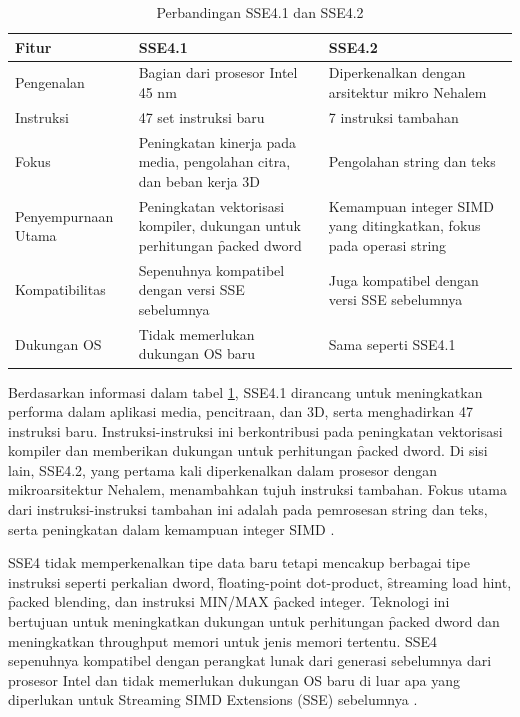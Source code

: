 \begin{table}[h]
	\centering
	\begin{tabular}{|p{3cm}|p{4.6cm}|p{4.6cm}|}
		\hline
		\textbf{Fitur}      & \textbf{SSE4.1}                                                               & \textbf{SSE4.2}                                                     \\ \hline
		Pengenalan          & Bagian dari prosesor Intel 45 nm                                              & Diperkenalkan dengan arsitektur mikro Nehalem                       \\ \hline
		Instruksi           & 47 set instruksi baru                                                         & 7 instruksi tambahan                                                \\ \hline
		Fokus               & Peningkatan kinerja pada media, pengolahan citra, dan beban kerja 3D          & Pengolahan string dan teks                                          \\ \hline
		Penyempurnaan Utama & Peningkatan vektorisasi kompiler, dukungan untuk perhitungan \f{packed dword} & Kemampuan integer SIMD yang ditingkatkan, fokus pada operasi string \\ \hline
		Kompatibilitas      & Sepenuhnya kompatibel dengan versi SSE sebelumnya                             & Juga kompatibel dengan versi SSE sebelumnya                         \\ \hline
		Dukungan OS         & Tidak memerlukan dukungan OS baru                                             & Sama seperti SSE4.1                                                 \\ \hline
	\end{tabular}
	\caption{Perbandingan SSE4.1 dan SSE4.2}
	\label{table:perbandingan_sse4}
\end{table}

Berdasarkan informasi dalam tabel \ref{table:perbandingan_sse4}, SSE4.1 dirancang untuk meningkatkan performa dalam aplikasi media, pencitraan, dan 3D, serta menghadirkan 47 instruksi baru. Instruksi-instruksi ini berkontribusi pada peningkatan vektorisasi kompiler dan memberikan dukungan untuk perhitungan \f{packed dword}. Di sisi lain, SSE4.2, yang pertama kali diperkenalkan dalam prosesor dengan mikroarsitektur Nehalem, menambahkan tujuh instruksi tambahan. Fokus utama dari instruksi-instruksi tambahan ini adalah pada pemrosesan string dan teks, serta peningkatan dalam kemampuan integer SIMD \cite{sse4reference}.

SSE4 tidak memperkenalkan tipe data baru tetapi mencakup berbagai tipe instruksi seperti perkalian dword, \f{floating-point dot-product}, \f{streaming load hint}, \f{packed blending}, dan instruksi MIN/MAX \f{packed integer}. Teknologi ini bertujuan untuk meningkatkan dukungan untuk perhitungan \f{packed dword} dan meningkatkan throughput memori untuk jenis memori tertentu. SSE4 sepenuhnya kompatibel dengan perangkat lunak dari generasi sebelumnya dari prosesor Intel dan tidak memerlukan dukungan OS baru di luar apa yang diperlukan untuk Streaming SIMD Extensions (SSE) sebelumnya \cite{sse4reference}.